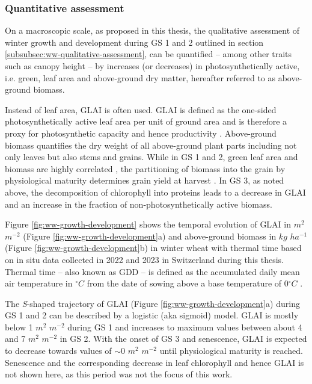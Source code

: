 \subsubsection{Quantitative assessment}
On a macroscopic scale, as proposed in this thesis, the qualitative assessment of winter growth and development during \gls{GS} 1 and 2 outlined in section \ref{subsubsec:ww-qualitative-assessment}, can be quantified -- among other traits such as canopy height \citep[for example]{kronenberg_monitoring_2017} -- by increases (or decreases) in photosynthetically active, i.e. green, leaf area and above-ground dry matter, hereafter referred to as above-ground biomass.

Instead of leaf area, \gls{GLAI} is often used. \gls{GLAI} is defined as the one-sided photosynthetically active leaf area per unit of ground area \citep{watson_dependence_1958,maddonni_leaf_1996} and is therefore a proxy for photosynthetic capacity and hence productivity \citep{gitelson_productivity_2015}. Above-ground biomass quantifies the dry weight of all above-ground plant parts including not only leaves but also stems and grains. While in \gls{GS} 1 and 2, green leaf area and biomass are highly correlated \citep{aase_relationship_1978}, the partitioning of biomass into the grain by physiological maturity determines grain yield at harvest \citep{singh_harvest_1971}. In \gls{GS} 3, as noted above, the decomposition of chlorophyll into proteins leads to a decrease in \gls{GLAI} and an increase in the fraction of non-photosynthetically active biomass.

Figure \ref{fig:ww-growth-development} shows the temporal evolution of \gls{GLAI} in $m^2$ $m^{-2}$ (Figure \ref{fig:ww-growth-development}a) and above-ground biomass in $kg$ $ha^{-1}$ (Figure \ref{fig:ww-growth-development}b) in winter wheat with thermal time based on in situ data collected in 2022 and 2023 in Switzerland during this thesis. Thermal time -- also known as \gls{GDD} -- is defined as the accumulated daily mean air temperature in $^{\circ} C$ from the date of sowing above a base temperature of 0$^{\circ} C$ \citep{mcmaster_growing_1997}.

The \textsl{S}-shaped trajectory of \gls{GLAI} (Figure \ref{fig:ww-growth-development}a) during \gls{GS} 1 and 2 can be described by a logistic (aka sigmoid) model. \gls{GLAI} is mostly below 1 $m^2$ $m^{-2}$ during \gls{GS} 1 and increases to maximum values between about 4 and 7 $m^2$ $m^{-2}$ in \gls{GS} 2. With the onset of \gls{GS} 3 and senescence, \gls{GLAI} is expected to decrease towards values of $\sim 0$ $m^2$ $m^{-2}$ until physiological maturity is reached. Senescence and the corresponding decrease in leaf chlorophyll and hence \gls{GLAI} is not shown here, as this period was not the focus of this work.

